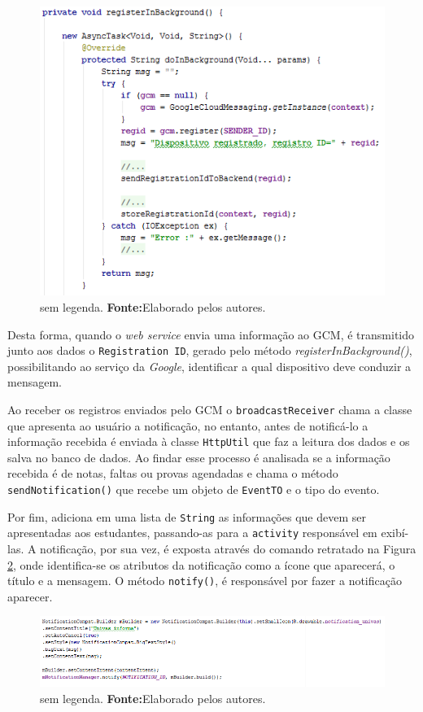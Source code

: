 	\begin{figure}[h!] 
		\centerline{\includegraphics[scale=0.60]{./imagens/2_q_metodologico/4_procedimentos_resultados/42_aplicativo/aplicativo11.png}}
		\caption[sem legenda]{sem legenda. \textbf{Fonte:}Elaborado pelos autores.}
		\label{fig:aplicativo11}
	\end{figure}
	
	\pagebreak
	
	\par Desta forma, quando o \textit{web service} envia uma informação ao GCM, é
transmitido junto aos dados o \texttt{Registration ID}, gerado pelo método
\textit{registerInBackground()}, possibilitando ao serviço da \textit{Google},
identificar a qual dispositivo deve conduzir a mensagem.

	\par Ao receber os registros enviados pelo GCM o \texttt{broadcastReceiver}
chama a classe que apresenta ao usuário a notificação, no entanto, antes de
notificá-lo a informação recebida é enviada à classe \texttt{HttpUtil} que faz
a leitura dos dados e os salva no banco de dados. Ao findar esse processo é
analisada se a informação recebida é de notas, faltas ou provas agendadas e
chama o método \texttt{sendNotification()} que recebe um objeto de
\texttt{EventTO} e o tipo do evento.

	\par Por fim, adiciona em uma lista de \texttt{String} as informações que devem
ser apresentadas aos estudantes, passando-as para a \texttt{activity}
responsável em exibí-las. A notificação, por sua vez, é exposta através do
comando retratado na Figura \ref{fig:aplicativo12}, onde identifica-se os
atributos da notificação como a ícone que aparecerá, o título e a mensagem. O
método \texttt{notify()}, é responsável por fazer a notificação aparecer.

	\begin{figure}[h!] 
		\centerline{\includegraphics[scale=0.60]{./imagens/2_q_metodologico/4_procedimentos_resultados/42_aplicativo/aplicativo12.png}}
		\caption[sem legenda]{sem legenda. \textbf{Fonte:}Elaborado pelos autores.}
		\label{fig:aplicativo12}
	\end{figure}
